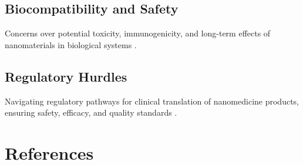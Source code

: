 \documentclass[12pt]{article}
\begin{document}
\subsection{Biocompatibility and Safety}
Concerns over potential toxicity, immunogenicity, and long-term effects of nanomaterials in biological systems \citep{chen2013review, pelaz2012biocompatibility}.

\subsection{Regulatory Hurdles}
Navigating regulatory pathways for clinical translation of nanomedicine products, ensuring safety, efficacy, and quality standards \citep{hirsch2013regulation, saffari2019regulatory}.

\section*{References}


\end{document}
